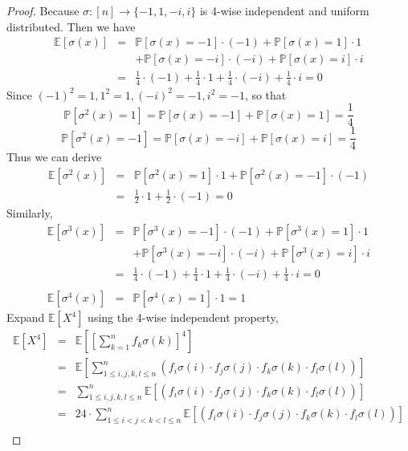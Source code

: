 \begin{proof}
				Because $\sigma: [n] \rightarrow \{-1, 1, -i, i\}$ is 4-wise independent and uniform distributed. Then we have 
				\begin{eqnarray*}
					\mathbb{E}[\sigma(x)] &= &\mathbb{P}[\sigma(x) = -1] \cdot (-1) + \mathbb{P}[\sigma(x) = 1] \cdot 1\\ 
					&& + \mathbb{P}[\sigma(x) = -i] \cdot (-i) + \mathbb{P}[\sigma(x) = i] \cdot i\\
					&= &\frac{1}{4} \cdot (-1) + \frac{1}{4} \cdot 1 + \frac{1}{4} \cdot (-i) + \frac{1}{4} \cdot i = 0
				\end{eqnarray*}
				Since $(-1)^2 = 1, 1^2 = 1, (-i)^2 = -1, i^2 = -1$, so that 
				\[\mathbb{P}[\sigma^2(x) = 1] = \mathbb{P}[\sigma(x) = -1] + \mathbb{P}[\sigma(x) = 1] = \frac{1}{4}\]
				\[\mathbb{P}[\sigma^2(x) = -1] = \mathbb{P}[\sigma(x) = -i] + \mathbb{P}[\sigma(x) = i] = \frac{1}{4}\]
				Thus we can derive
				\begin{eqnarray*}
					\mathbb{E}[\sigma^2(x)] &= &\mathbb{P}[\sigma^2(x) = 1] \cdot 1 + \mathbb{P}[\sigma^2(x) = -1] \cdot (-1)\\ 
					&= &\frac{1}{2} \cdot 1 + \frac{1}{2} \cdot (-1)=0
				\end{eqnarray*}
 				Similarly, 
 				\begin{eqnarray*}
					\mathbb{E}[\sigma^3(x)] &= &\mathbb{P}[\sigma^3(x) = -1] \cdot (-1) + \mathbb{P}[\sigma^3(x) = 1] \cdot 1\\ 
					&& + \mathbb{P}[\sigma^3(x) = -i] \cdot (-i) + \mathbb{P}[\sigma^3(x) = i] \cdot i\\
					&= &\frac{1}{4} \cdot (-1) + \frac{1}{4} \cdot 1 + \frac{1}{4} \cdot (-i) + \frac{1}{4} \cdot i = 0\\\\
					\mathbb{E}[\sigma^4(x)] &= &\mathbb{P}[\sigma^4(x) = 1] \cdot 1 = 1
				\end{eqnarray*}
				Expand $\mathbb{E}[X^4]$ using the 4-wise independent property,
				\begin{eqnarray*}
					\mathbb{E}[X^4] &= &\mathbb{E}[[\sum_{k=1}^n f_k \sigma(k)]^4]\\
					&= &\mathbb{E}[\sum_{1 \leq i, j ,k, l \leq n}^n (f_i \sigma(i) \cdot f_j \sigma(j) \cdot f_k \sigma(k) \cdot f_l \sigma(l))]\\
					&= &\sum_{1 \leq i, j ,k, l \leq n}^n\mathbb{E}[(f_i \sigma(i) \cdot f_j \sigma(j) \cdot f_k \sigma(k) \cdot f_l \sigma(l))]\\
					&= &24\cdot\sum_{1 \leq i< j < k < l \leq n}^n\mathbb{E}[(f_i \sigma(i) \cdot f_j \sigma(j) \cdot f_k \sigma(k) \cdot f_l \sigma(l))]\\

\end{eqnarray*}
\end{proof}
